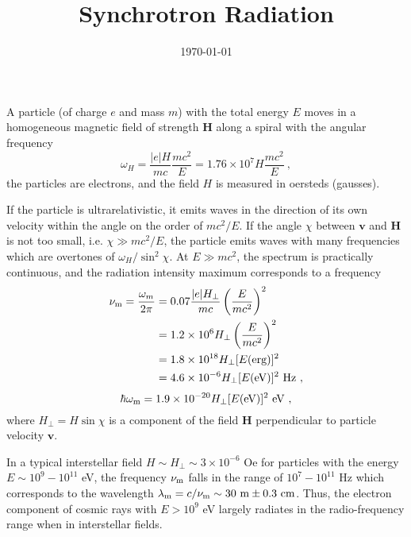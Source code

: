 \documentclass[12pt,a4paper]{article}
\title{Synchrotron Radiation}
\author{}
\date{\today}
\renewcommand{\vec}[1]{\boldsymbol{#1}}
\begin{document}
\maketitle

\cite{1996PhyU...39..155G} A particle (of charge $e$ and mass $m$) with the total energy $E$ moves in a homogeneous magnetic field of strength $\vec{H}$ along a spiral with the angular frequency
\begin{equation}
\omega_H = \dfrac{|e|H}{mc} \dfrac{mc^2}{E} = 1.76 \times 10^7 H \dfrac{mc^2}{E} ~,
\end{equation}
the particles are electrons, and the field $H$ is measured in oersteds (gausses).

If the particle is ultrarelativistic, it emits waves in the direction of its own velocity within the angle on the order of $mc^2/E$. If the angle $\chi$ between $\vec{v}$ and $\vec{H}$ is not too small, i.e. $\chi \gg mc^2/E$, the particle emits waves with many frequencies which are overtones of $\omega_H/\sin^2 \chi$. At $E \gg mc^2$, the spectrum is practically continuous, and the radiation intensity maximum corresponds to a frequency
\begin{align}
\nonumber \nu_{\rm m} = \dfrac{\omega_m}{2\pi} &= 0.07 \dfrac{|e| H_\perp}{mc} \left(\dfrac{E}{mc^2} \right)^2 \\
\nonumber &= 1.2\times 10^6 H_\perp \left(\dfrac{E}{mc^2} \right)^2 \\
\nonumber &= 1.8\times 10^{18} H_\perp [E(\rm erg)]^2 \\
&= 4.6\times 10^{-6} H_\perp [E(\rm eV)]^2 ~Hz ~, 
\end{align}
\begin{equation}
\hbar \omega_{\rm m} = 1.9 \times 10^{-20} H_\perp [E(\rm eV)]^2 ~eV ~,
\end{equation}
where $H_\perp = H \sin \chi$ is a component of the field $\vec{H}$ perpendicular to particle velocity $\vec{v}$.

In a typical interstellar field $H \sim H_\perp \sim 3 \times 10^{-6}$ Oe for
particles with the energy $E \sim 10^9 - 10^{11}$ eV, the frequency $\nu_{\rm m}$ falls in the range of $10^7 - 10^{11}$ Hz which corresponds to the wavelength $\lambda_{\rm m} =c/\nu_{\rm m} \sim 30 ~{\rm m} \pm 0.3 ~{\rm cm}$. Thus, the electron component of cosmic rays with $E > 10^9$ eV largely radiates in the radio-frequency range when in interstellar fields.
\end{document}
